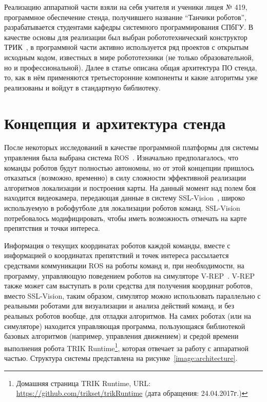 \documentclass{spisok-article}
\begin{document}
Реализацию аппаратной части взяли на себя учителя и ученики лицея № 419, программное обеспечение стенда, получившего название ``Танчики роботов'', разрабатывается студентами кафедры системного программирования СПбГУ. В качестве основы для реализации был выбран робототехнический конструктор ТРИК~\cite{terekhov2012trik}, в программной части активно используется ряд проектов с открытым исходным кодом, известных в мире робототехники (не только образовательной, но и профессиональной). Далее в статье описана общая архитектура ПО стенда, то, как в нём применяются третьесторонние компоненты и какие алгоритмы уже реализованы и войдут в стандартную библиотеку.

\section{Концепция и архитектура стенда}

После некоторых исследований в качестве программной платформы для системы управления была выбрана система ROS~\cite{quigley2009ros}. Изначально предполагалось, что команды роботов будут полностью автономны, но от этой концепции пришлось отказаться (возможно, временно) в силу сложности эффективной реализации алгоритмов локализации и построения карты. На данный момент над полем боя находится видеокамера, передающая данные в систему SSL-Vision~\cite{zickler2010sslvision}, широко используемую в робофутболе для локализации роботов команд. SSL-Vision потребовалось модифицировать, чтобы иметь возможность отмечать на карте препятствия и точки интереса. 

Информация о текущих координатах роботов каждой команды, вместе с информацией о координатах препятствий и точек интереса рассылается средствами коммуникации ROS на роботы команд и, при необходимости, на программу, управляющую поведением роботов на симуляторе V-REP~\cite{rohmer2013vrep}. V-REP также может сам выступать в роли средства для получения координат роботов, вместо SSL-Vision, таким образом, симулятор можно использовать параллельно с реальными роботами для визуализации и анализа действий команд, и без реальных роботов вообще, для отладки алгоритмов. На самих роботах (или на симуляторе) находится управляющая программа, пользующаяся библиотекой базовых алгоритмов (например, управления движением) и средой времени выполнения робота TRIK Runtime\footnote{Домашняя страница TRIK Runtime, URL: \url{https://github.com/trikset/trikRuntime} (дата обращения: 24.04.2017г.)}, которая отвечает за работу с аппаратной частью. Структура системы представлена на рисунке~\ref{image:architecture}.
\end{document}

